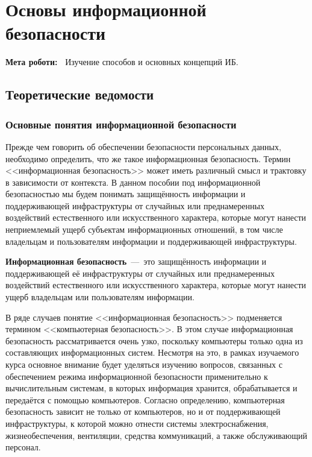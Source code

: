 \chapter{Основы информационной безопасности} \label{chapt1}%
\textbf{Мета роботи:~}%
Изучение способов и основных концепций ИБ.
\section{Теоретические ведомости} \label{sect1_a}
%
\subsection{Основные понятия информационной безопасности}

Прежде чем говорить об обеспечении безопасности персональных данных,
необходимо определить, что же такое информационная безопасность. Термин
<<информационная безопасность>> может иметь различный смысл и трактовку в
зависимости от контекста. В данном пособии под информационной безопасностью
мы будем понимать защищённость информации и поддерживающей инфраструктуры от
случайных или преднамеренных воздействий естественного или искусственного
характера, которые могут нанести неприемлемый ущерб субъектам информационных
отношений, в том числе владельцам и пользователям информации и поддерживающей
инфраструктуры.\href{https://www.intuit.ru/studies/courses/697/553/literature#literature.1}{\todo{[1]}}

\textbf{Информационная безопасность}~---~это защищённость информации и
поддерживающей её инфраструктуры от случайных или преднамеренных воздействий
естественного или искусственного характера, которые могут нанести ущерб
владельцам или пользователям информации.

В ряде случаев понятие <<информационная безопасность>> подменяется термином
<<компьютерная безопасность>>. В этом случае информационная безопасность
рассматривается очень узко, поскольку компьютеры только одна из составляющих
информационных систем. Несмотря на это, в рамках изучаемого курса основное
внимание будет уделяться изучению вопросов, связанных с обеспечением режима
информационной безопасности применительно к вычислительным системам, в
которых информация хранится, обрабатывается и передаётся с помощью
компьютеров. Согласно определению, компьютерная безопасность зависит не
только от компьютеров, но и от поддерживающей инфраструктуры, к которой можно
отнести системы электроснабжения, жизнеобеспечения, вентиляции, средства
коммуникаций, а также обслуживающий персонал.


